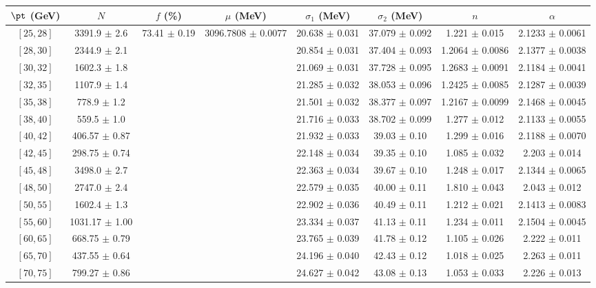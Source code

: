 \begin{tabular}{c||c|c|c|c|c|c|c}
$\pt$ (GeV) & $N$ & $f$ (\%) & $\mu$ (MeV) & $\sigma_1$ (MeV) & $\sigma_2$ (MeV) & $n$ & $\alpha$ \\
\hline
$[25, 28]$ & 3391.9 $\pm$ 2.6 & \multirow{19}{*}{73.41 $\pm$ 0.19} & \multirow{19}{*}{3096.7808 $\pm$ 0.0077} & 20.638 $\pm$ 0.031 & 37.079 $\pm$ 0.092 & 1.221 $\pm$ 0.015 & 2.1233 $\pm$ 0.0061\\
$[28, 30]$ & 2344.9 $\pm$ 2.1 &  &  & 20.854 $\pm$ 0.031 & 37.404 $\pm$ 0.093 & 1.2064 $\pm$ 0.0086 & 2.1377 $\pm$ 0.0038\\
$[30, 32]$ & 1602.3 $\pm$ 1.8 &  &  & 21.069 $\pm$ 0.031 & 37.728 $\pm$ 0.095 & 1.2683 $\pm$ 0.0091 & 2.1184 $\pm$ 0.0041\\
$[32, 35]$ & 1107.9 $\pm$ 1.4 &  &  & 21.285 $\pm$ 0.032 & 38.053 $\pm$ 0.096 & 1.2425 $\pm$ 0.0085 & 2.1287 $\pm$ 0.0039\\
$[35, 38]$ & 778.9 $\pm$ 1.2 &  &  & 21.501 $\pm$ 0.032 & 38.377 $\pm$ 0.097 & 1.2167 $\pm$ 0.0099 & 2.1468 $\pm$ 0.0045\\
$[38, 40]$ & 559.5 $\pm$ 1.0 &  &  & 21.716 $\pm$ 0.033 & 38.702 $\pm$ 0.099 & 1.277 $\pm$ 0.012 & 2.1133 $\pm$ 0.0055\\
$[40, 42]$ & 406.57 $\pm$ 0.87 &  &  & 21.932 $\pm$ 0.033 & 39.03 $\pm$ 0.10 & 1.299 $\pm$ 0.016 & 2.1188 $\pm$ 0.0070\\
$[42, 45]$ & 298.75 $\pm$ 0.74 &  &  & 22.148 $\pm$ 0.034 & 39.35 $\pm$ 0.10 & 1.085 $\pm$ 0.032 & 2.203 $\pm$ 0.014\\
$[45, 48]$ & 3498.0 $\pm$ 2.7 &  &  & 22.363 $\pm$ 0.034 & 39.67 $\pm$ 0.10 & 1.248 $\pm$ 0.017 & 2.1344 $\pm$ 0.0065\\
$[48, 50]$ & 2747.0 $\pm$ 2.4 &  &  & 22.579 $\pm$ 0.035 & 40.00 $\pm$ 0.11 & 1.810 $\pm$ 0.043 & 2.043 $\pm$ 0.012\\
$[50, 55]$ & 1602.4 $\pm$ 1.3 &  &  & 22.902 $\pm$ 0.036 & 40.49 $\pm$ 0.11 & 1.212 $\pm$ 0.021 & 2.1413 $\pm$ 0.0083\\
$[55, 60]$ & 1031.17 $\pm$ 1.00 &  &  & 23.334 $\pm$ 0.037 & 41.13 $\pm$ 0.11 & 1.234 $\pm$ 0.011 & 2.1504 $\pm$ 0.0045\\
$[60, 65]$ & 668.75 $\pm$ 0.79 &  &  & 23.765 $\pm$ 0.039 & 41.78 $\pm$ 0.12 & 1.105 $\pm$ 0.026 & 2.222 $\pm$ 0.011\\
$[65, 70]$ & 437.55 $\pm$ 0.64 &  &  & 24.196 $\pm$ 0.040 & 42.43 $\pm$ 0.12 & 1.018 $\pm$ 0.025 & 2.263 $\pm$ 0.011\\
$[70, 75]$ & 799.27 $\pm$ 0.86 &  &  & 24.627 $\pm$ 0.042 & 43.08 $\pm$ 0.13 & 1.053 $\pm$ 0.033 & 2.226 $\pm$ 0.013\\

\end{tabular}
